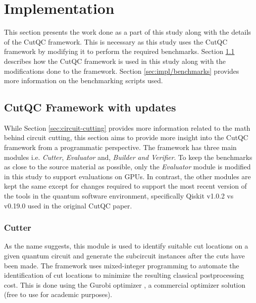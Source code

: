 \section{Implementation}
\label{chap:implementation}

This section presents the work done as a part of this study along with the details of the CutQC framework. This is necessary as this study uses the CutQC framework by modifying it to perform the required benchmarks. Section \ref{sec:impl/cutqc} describes how the CutQC framework is used in this study along with the modifications done to the framework. Section \ref{sec:impl/benchmarks} provides more information on the benchmarking scripts used.




\subsection{CutQC Framework with updates}
\label{sec:impl/cutqc}

While Section \ref{sec:circuit-cutting} provides more information related to the math behind circuit cutting, this section aims to provide more insight into the CutQC framework from a programmatic perspective. The framework has three main modules i.e. \textit{Cutter}, \textit{Evaluator} and, \textit{Builder and Verifier}. To keep the benchmarks as close to the source material as possible, only the \textit{Evaluator} module is modified in this study to support evaluations on GPUs. In contrast, the other modules are kept the same except for changes required to support the most recent version of the tools in the quantum software environment, specifically Qiskit v1.0.2 vs v0.19.0 used in the original CutQC paper.



\subsubsection{Cutter}

As the name suggests, this module is used to identify suitable cut locations on a given quantum circuit and generate the subcircuit instances after the cuts have been made. The framework uses mixed-integer programming to automate the identification of cut locations to minimize the resulting classical postprocessing cost. This is done using the Gurobi optimizer \cite{gurobi}, a commercial optimizer solution (free to use for academic purposes).  


